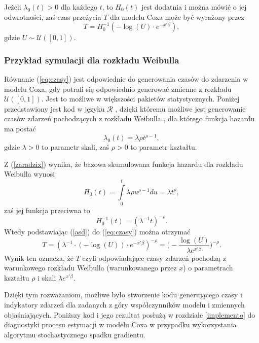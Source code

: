 Jeżeli $\lambda_0(t) >0$ dla każdego $t$, to $H_0(t)$ jest dodatnia i można mówić o jej odwrotności, zaś czas przeżycia $T$ dla modelu Coxa może być wyrażony przez 
\begin{equation}\label{eq:czasy}
T = H_0^{-1}(-\log(U)\cdot e^{-x'\beta}),
\end{equation}
gdzie  $U \sim \mathcal{U}([0,1])$.

\subsubsection{Przykład symulacji dla rozkładu Weibulla}\label{symWei}

Równanie (\ref{eq:czasy})  jest odpowiednie do generowania czasów do zdarzenia w modelu Coxa, gdy potrafi się odpowiednio generować zmienne z rozkładu $\mathcal{U}([0,1])$. Jest to możliwe w większości pakietów statystycznych. Poniżej przedstawiony jest kod w języku $\mathcal{R}$ \cite{programikr}, dzięki któremu możliwe jest generowanie czasów zdarzeń pochodzących z rozkładu Weibulla \cite{collett}, dla którego funkcja hazardu ma postać
\begin{equation}
\lambda_0(t)=\lambda\rho t^{\rho-1},
\end{equation}
gdzie $\lambda>0$ to parametr skali, zaś $\rho > 0$ to parametr kształtu.

\newpage

Z (\ref{zaradzix}) wynika, że bazowa skumulowana funkcja hazardu dla rozkładu Weibulla wynosi
\begin{equation}
H_0(t) = \int\limits_{0}^{t} \lambda\rho u^{\rho-1} du = \lambda t^{\rho},
\end{equation}
zaś jej funkcja przeciwna to
\begin{equation}\label{asd}
H_0^{-1}(t)= (\lambda^{-1}t)^{-\rho}.
\end{equation}
Wtedy podstawiając (\ref{asd}) do (\ref{eq:czasy}) można otrzymać
\begin{equation}
T = (\lambda^{-1}\cdot(-\log(U))\cdot e^{-x'\beta})^{-\rho} = \Big(-\frac{\log(U)}{\lambda e^{x'\beta}}\Big)^{-\rho}.
\end{equation}
Wynik ten oznacza, że $T$ czyli odpowiadające czasy zdarzeń pochodzą z warunkowego rozkładu Weibulla (warunkowanego przez $x$) o parametrach kształtu $\rho$ i skali $\lambda  e^{x'\beta}$.

Dzięki tym rozważaniom, możliwe było stworzenie kodu generującego czasy i indykatory zdarzeń dla zadanych z góry współczynników modelu i zmiennych objaśniających. Poniższy kod i jego rezultat posłużą w rozdziale \ref{implemento} do diagnostyki procesu estymacji w modelu Coxa w przypadku wykorzystania algorytmu stochastycznego spadku gradientu.


